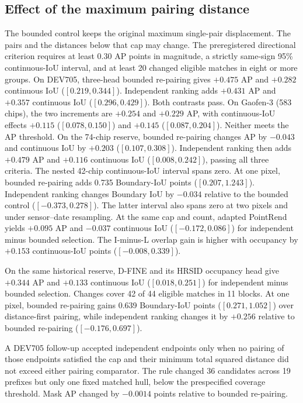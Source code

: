 \subsection{Effect of the maximum pairing distance}
\label{sec:pairing-effects}
The bounded control keeps the original maximum single-pair displacement. The pairs and the distances below that cap may change. The preregistered directional criterion requires at least 0.30 AP points in magnitude, a strictly same-sign 95\% continuous-IoU interval, and at least 20 changed eligible matches in eight or more groups. On DEV705, three-head bounded re-pairing gives \(+0.475\) AP and \(+0.282\) continuous IoU (\([0.219,0.344]\)). Independent ranking adds \(+0.431\) AP and \(+0.357\) continuous IoU (\([0.296,0.429]\)). Both contrasts pass. On Gaofen-3 (583 chips), the two increments are \(+0.254\) and \(+0.229\) AP, with continuous-IoU effects \(+0.115\) (\([0.078,0.150]\)) and \(+0.145\) (\([0.087,0.204]\)). Neither meets the AP threshold. On the 74-chip reserve, bounded re-pairing changes AP by \(-0.043\) and continuous IoU by \(+0.203\) (\([0.107,0.308]\)). Independent ranking then adds \(+0.479\) AP and \(+0.116\) continuous IoU (\([0.008,0.242]\)), passing all three criteria. The nested 42-chip continuous-IoU interval spans zero. At one pixel, bounded re-pairing adds 0.735 Boundary-IoU points (\([0.207,1.243]\)). Independent ranking changes Boundary IoU by \(-0.034\) relative to the bounded control (\([-0.373,0.278]\)). The latter interval also spans zero at two pixels and under sensor--date resampling. At the same cap and count, adapted PointRend yields \(+0.095\) AP and \(-0.037\) continuous IoU (\([-0.172,0.086]\)) for independent minus bounded selection. The I-minus-L overlap gain is higher with occupancy by \(+0.153\) continuous-IoU points (\([-0.008,0.339]\)).

On the same historical reserve, D-FINE and its HRSID occupancy head give \(+0.344\) AP and \(+0.133\) continuous IoU (\([0.018,0.251]\)) for independent minus bounded selection. Changes cover 42 of 44 eligible matches in 11 blocks. At one pixel, bounded re-pairing gains 0.639 Boundary-IoU points (\([0.271,1.052]\)) over distance-first pairing, while independent ranking changes it by \(+0.256\) relative to bounded re-pairing (\([-0.176,0.697]\)).

A DEV705 follow-up accepted independent endpoints only when no pairing of those endpoints satisfied the cap and their minimum total squared distance did not exceed either pairing comparator. The rule changed 36 candidates across 19 prefixes but only one fixed matched hull, below the prespecified coverage threshold. Mask AP changed by \(-0.0014\) points relative to bounded re-pairing.

